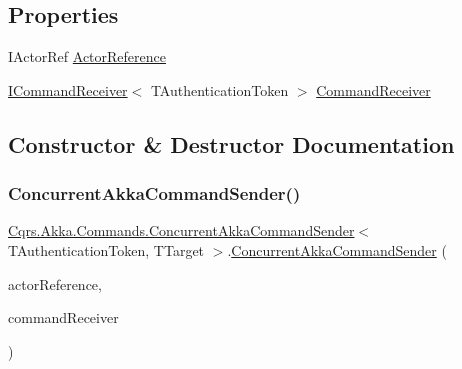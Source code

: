 \subsection*{Properties}
\begin{DoxyCompactItemize}
\item 
I\+Actor\+Ref \hyperlink{classCqrs_1_1Akka_1_1Commands_1_1ConcurrentAkkaCommandSender_a6c5acb131074e98841ddac12da654969}{Actor\+Reference}
\item 
\hyperlink{interfaceCqrs_1_1Commands_1_1ICommandReceiver}{I\+Command\+Receiver}$<$ T\+Authentication\+Token $>$ \hyperlink{classCqrs_1_1Akka_1_1Commands_1_1ConcurrentAkkaCommandSender_a37bf6191b21d98e14d9070b36bb2d0fe}{Command\+Receiver}
\end{DoxyCompactItemize}


\subsection{Constructor \& Destructor Documentation}
\mbox{\label{classCqrs_1_1Akka_1_1Commands_1_1ConcurrentAkkaCommandSender_a203cd12567f100fb3545b029f6ed0181}} 
\subsubsection{\texorpdfstring{Concurrent\+Akka\+Command\+Sender()}{ConcurrentAkkaCommandSender()}}
{\footnotesize\ttfamily \hyperlink{classCqrs_1_1Akka_1_1Commands_1_1ConcurrentAkkaCommandSender}{Cqrs.\+Akka.\+Commands.\+Concurrent\+Akka\+Command\+Sender}$<$ T\+Authentication\+Token, T\+Target $>$.\hyperlink{classCqrs_1_1Akka_1_1Commands_1_1ConcurrentAkkaCommandSender}{Concurrent\+Akka\+Command\+Sender} (\begin{DoxyParamCaption}\item[{I\+Actor\+Ref}]{actor\+Reference,  }\item[{\hyperlink{interfaceCqrs_1_1Commands_1_1ICommandReceiver}{I\+Command\+Receiver}$<$ T\+Authentication\+Token $>$}]{command\+Receiver }\end{DoxyParamCaption})}



